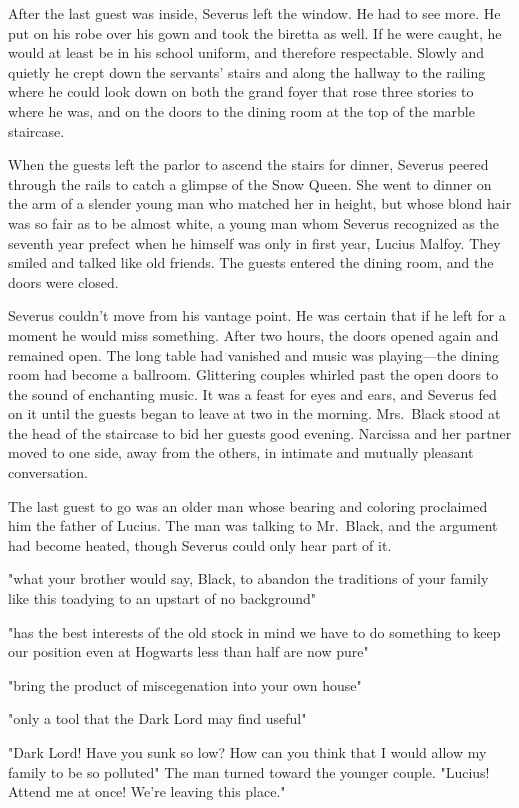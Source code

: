 After the last guest was inside, Severus left the window. He had to see more. He put on his robe over his gown and took the biretta as well. If he were caught, he would at least be in his school uniform, and therefore respectable. Slowly and quietly he crept down the servants' stairs and along the hallway to the railing where he could look down on both the grand foyer that rose three stories to where he was, and on the doors to the dining room at the top of the marble staircase.

When the guests left the parlor to ascend the stairs for dinner, Severus peered through the rails to catch a glimpse of the Snow Queen. She went to dinner on the arm of a slender young man who matched her in height, but whose blond hair was so fair as to be almost white, a young man whom Severus recognized as the seventh year prefect when he himself was only in first year, Lucius Malfoy. They smiled and talked like old friends. The guests entered the dining room, and the doors were closed.

Severus couldn't move from his vantage point. He was certain that if he left for a moment he would miss something. After two hours, the doors opened again and remained open. The long table had vanished and music was playing—the dining room had become a ballroom. Glittering couples whirled past the open doors to the sound of enchanting music. It was a feast for eyes and ears, and Severus fed on it until the guests began to leave at two in the morning. Mrs.~Black stood at the head of the staircase to bid her guests good evening. Narcissa and her partner moved to one side, away from the others, in intimate and mutually pleasant conversation.

The last guest to go was an older man whose bearing and coloring proclaimed him the father of Lucius. The man was talking to Mr.~Black, and the argument had become heated, though Severus could only hear part of it.

"{\el}what your brother would say, Black, to abandon the traditions of your family like this{\el} toadying to an upstart of no background{\el}"

"{\el}has the best interests of the old stock in mind{\el} we have to do something to keep our position{\el} even at Hogwarts less than half are now pure{\el}"

"{\el}bring the product of miscegenation into your own house{\el}"

"{\el}only a tool that the Dark Lord may find useful{\el}"

"Dark Lord! Have you sunk so low? How can you think that I would allow my family to be so polluted{\el}" The man turned toward the younger couple. "Lucius! Attend me at once! We're leaving this place."

